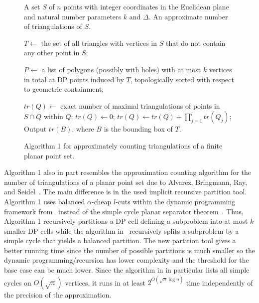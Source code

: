 \documentclass[a4paper]{article}
\begin{document}
\begin{figure}
\begin{algorithmic}[1]
\REQUIRE A set $S$ of $n$ points with integer
coordinates in the Euclidean plane
and natural number parameters $k$ and $\Delta$. 
\ENSURE  An approximate number of triangulations of $S$. 

\STATE $T\leftarrow$
the set of all triangles
with vertices in $S$
that do not contain 
any other point in $S$;

\STATE $P\leftarrow $ a list 
of polygons (possibly with holes)
with at most $k$ vertices in total
at DP points induced by $T$,
topologically sorted 
with respect to geometric containment;

\STATE $tr(Q)\leftarrow$ exact number
of maximal triangulations
of points in $S\cap Q$ 
within $Q$;
\ENDFOR
{} 
\STATE $tr(Q)\leftarrow 0$;
\STATE $tr(Q)\leftarrow tr(Q)+\prod_{j=1}^ltr(Q_j)$;
\ENDFOR
\ENDFOR
\STATE Output $tr(B)$, where $B$ is
the bounding box of $T$.
\end{algorithmic}
\caption{Algorithm 1 for approximately counting
triangulations of a finite planar point set.}
\label{fig: algo1}
\end{figure}

Algorithm 1 also in part resembles the approximation counting algorithm
for the number of triangulations of a planar point
set due to Alvarez, Bringmann, Ray, and Seidel~\cite{ABRS13}.
The main difference is in the used implicit recursive partition
tool. Algorithm 1 uses balanced $\alpha$-cheap $l$-cuts
within the dynamic programming framework from~\cite{AW13}
instead of the simple cycle planar
separator theorem~\cite{ABRS13,M86}.
Thus, Algorithm 1 recursively partitions 
a DP cell defining a subproblem into
at most $k$ smaller DP-cells while the
algorithm in~\cite{ABRS13} recursively
splits a subproblem by a simple cycle
that yields a balanced partition. 
The
new partition tool gives a better running time since the number of
possible partitions is much smaller so the dynamic
programming/recursion has lower complexity and the threshold for the
base case can be much lower.  Since the algorithm in \cite{ABRS13} in
particular lists all simple cycles on $O(\sqrt n)$ vertices, it runs
in at least $2^{O(\sqrt n \log n)}$ time independently of the
precision of the approximation.
\end{document}
